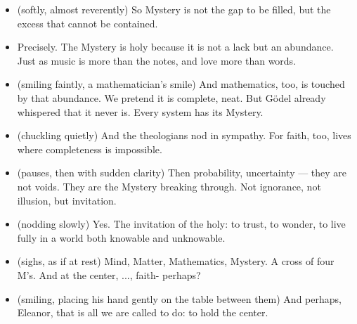 \begin{itemize}[leftmargin=2cm,labelsep=1em]
    \item[\textbf{Eleanor:}] (softly, almost reverently)  
    So Mystery is not the gap to be filled, but the excess that cannot be contained.

    \item[\textbf{Priest:}]  
    Precisely. The Mystery is holy because it is not a lack but an abundance.  
    Just as music is more than the notes, and love more than words.

    \item[\textbf{Eleanor:}] (smiling faintly, a mathematician’s smile)  
    And mathematics, too, is touched by that abundance.  
    We pretend it is complete, neat.  
    But Gödel already whispered that it never is.  
    Every system has its Mystery.

    \item[\textbf{Priest:}] (chuckling quietly)  
    And the theologians nod in sympathy.  
    For faith, too, lives where completeness is impossible.

    \item[\textbf{Eleanor:}] (pauses, then with sudden clarity)  
    Then probability, uncertainty --- they are not voids.  
    They are the Mystery breaking through.  
    Not ignorance, not illusion, but invitation.

    \item[\textbf{Priest:}] (nodding slowly)  
    Yes. The invitation of the holy: to trust, to wonder,  
    to live fully in a world both knowable and unknowable.

    \item[\textbf{Eleanor:}] (sighs, as if at rest)  
    Mind, Matter, Mathematics, Mystery.  
    A cross of four M’s.  
    And at the center, ..., faith- perhaps?

    \item[\textbf{Priest:}] (smiling, placing his hand gently on the table between them)  
    And perhaps, Eleanor, that is all we are called to do: to hold the center.
\end{itemize}

